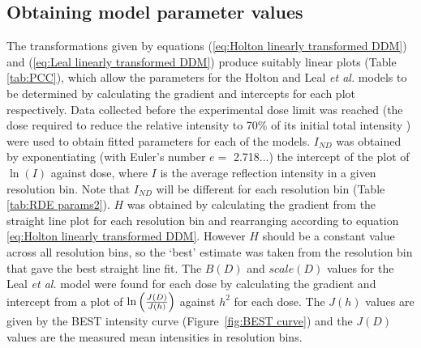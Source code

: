 \subsection{Obtaining model parameter values}
\label{sub:Obtaining Model Parameter Values}
The transformations given by equations (\ref{eq:Holton linearly transformed DDM}) and (\ref{eq:Leal linearly transformed DDM}) produce suitably linear plots (Table \ref{tab:PCC}), which allow the parameters for the Holton and Leal \emph{et al.} models to be determined by calculating the gradient and intercepts for each plot respectively.
Data collected before the experimental dose limit was reached (the dose required to reduce the relative intensity to 70\% of its initial total intensity \cite{owen2006}) were used to obtain fitted parameters for each of the models.
$I_{ND}$ was obtained by exponentiating (with Euler's number $e =$ 2.718...) the intercept of the plot of $\ln(I)$ against dose, where $I$ is the average reflection intensity in a given resolution bin.
Note that $I_{ND}$ will be different for each resolution bin (Table \ref{tab:RDE params2}).
$H$ was obtained by calculating the gradient from the straight line plot for each resolution bin and rearranging according to equation \ref{eq:Holton linearly transformed DDM}.
However $H$ should be a constant value across all resolution bins, so the `best' estimate was taken from the resolution bin that gave the best straight line fit.
\newline
The $B(D)$ and $scale(D)$ values for the Leal \emph{et al.} model were found for each dose by calculating the gradient and intercept from a plot of $\ln \left(\frac{J(D)}{J(h)}\right)$ against $h^2$ for each dose.
The $J(h)$ values are given by the BEST intensity curve \cite{popov2003} (Figure~\ref{fig:BEST curve}) and the $J(D)$ values are the measured mean intensities in resolution bins.
